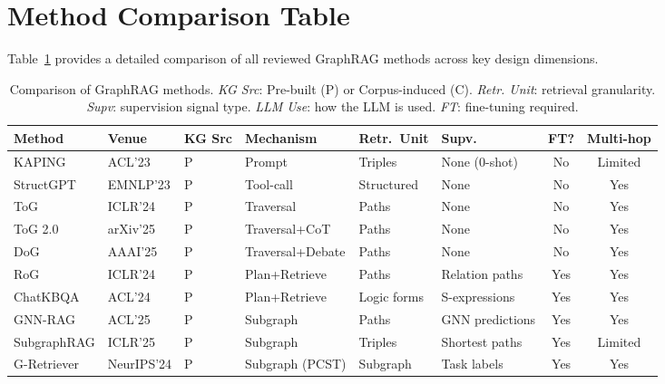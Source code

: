 \documentclass[11pt]{article}
\begin{document}


\appendix

\section{Method Comparison Table}
\label{sec:appendix_table}

Table~\ref{tab:methods} provides a detailed comparison of all reviewed GraphRAG methods across key design dimensions.

\begin{table}[t]
\centering
\small
\caption{Comparison of GraphRAG methods. \textit{KG Src}: Pre-built (P) or Corpus-induced (C). \textit{Retr. Unit}: retrieval granularity. \textit{Supv}: supervision signal type. \textit{LLM Use}: how the LLM is used. \textit{FT}: fine-tuning required.}
\label{tab:methods}
\setlength{\tabcolsep}{4pt}
\begin{tabular}{llllllcc}
\toprule
\textbf{Method} & \textbf{Venue} & \textbf{KG Src} & \textbf{Mechanism} & \textbf{Retr.\ Unit} & \textbf{Supv.} & \textbf{FT?} & \textbf{Multi-hop} \\
\midrule
KAPING       & ACL'23  & P & Prompt        & Triples      & None (0-shot)    & No  & Limited \\
StructGPT    & EMNLP'23 & P & Tool-call      & Structured   & None             & No  & Yes \\
ToG          & ICLR'24 & P & Traversal      & Paths        & None             & No  & Yes \\
ToG 2.0      & arXiv'25 & P & Traversal+CoT & Paths        & None             & No  & Yes \\
DoG          & AAAI'25 & P & Traversal+Debate & Paths      & None             & No  & Yes \\
RoG          & ICLR'24 & P & Plan+Retrieve  & Paths        & Relation paths   & Yes & Yes \\
ChatKBQA     & ACL'24  & P & Plan+Retrieve  & Logic forms  & S-expressions    & Yes & Yes \\
GNN-RAG      & ACL'25  & P & Subgraph       & Paths        & GNN predictions  & Yes & Yes \\
SubgraphRAG  & ICLR'25 & P & Subgraph       & Triples      & Shortest paths   & Yes & Limited \\
G-Retriever  & NeurIPS'24 & P & Subgraph (PCST) & Subgraph  & Task labels      & Yes & Yes \\

\end{tabular}
\end{table}
\end{document}
